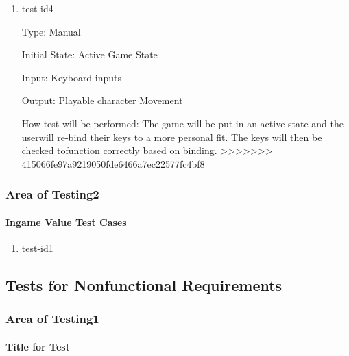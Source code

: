 \documentclass[12pt, titlepage]{article}
\begin{document}
\begin{enumerate}
\item{test-id4\\}

Type: Manual

Initial State: Active Game State 

Input: Keyboard inputs

Output: Playable character Movement

How test will be performed: The game will be put in an active state and the
userwill re-bind their keys to a more personal fit. The keys will then be
checked tofunction correctly based on binding.
>>>>>>> 415066fe97a9219050fde6466a7ec22577fc4bf8

\end{enumerate}

\subsubsection{Area of Testing2}

\paragraph{Ingame Value Test Cases}

\begin{enumerate}

\item{test-id1\\}

\end{enumerate}

\subsection{Tests for Nonfunctional Requirements}

\subsubsection{Area of Testing1}
		
\paragraph{Title for Test}
\end{document}
